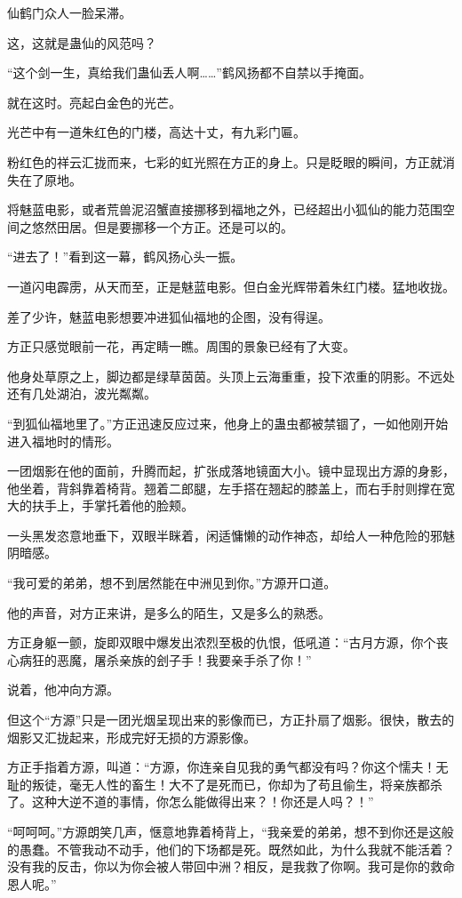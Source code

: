 \begin{this_body}
仙鹤门众人一脸呆滞。

这，这就是蛊仙的风范吗？

“这个剑一生，真给我们蛊仙丢人啊……”鹤风扬都不自禁以手掩面。

就在这时。亮起白金色的光芒。

光芒中有一道朱红色的门楼，高达十丈，有九彩门匾。

粉红色的祥云汇拢而来，七彩的虹光照在方正的身上。只是眨眼的瞬间，方正就消失在了原地。

将魅蓝电影，或者荒兽泥沼蟹直接挪移到福地之外，已经超出小狐仙的能力范围空间之悠然田居。但是要挪移一个方正。还是可以的。

“进去了！”看到这一幕，鹤风扬心头一振。

一道闪电霹雳，从天而至，正是魅蓝电影。但白金光辉带着朱红门楼。猛地收拢。

差了少许，魅蓝电影想要冲进狐仙福地的企图，没有得逞。

方正只感觉眼前一花，再定睛一瞧。周围的景象已经有了大变。

他身处草原之上，脚边都是绿草茵茵。头顶上云海重重，投下浓重的阴影。不远处还有几处湖泊，波光粼粼。

“到狐仙福地里了。”方正迅速反应过来，他身上的蛊虫都被禁锢了，一如他刚开始进入福地时的情形。

一团烟影在他的面前，升腾而起，扩张成落地镜面大小。镜中显现出方源的身影，他坐着，背斜靠着椅背。翘着二郎腿，左手搭在翘起的膝盖上，而右手肘则撑在宽大的扶手上，手掌托着他的脸颊。

一头黑发恣意地垂下，双眼半眯着，闲适慵懒的动作神态，却给人一种危险的邪魅阴暗感。

“我可爱的弟弟，想不到居然能在中洲见到你。”方源开口道。

他的声音，对方正来讲，是多么的陌生，又是多么的熟悉。

方正身躯一颤，旋即双眼中爆发出浓烈至极的仇恨，低吼道：“古月方源，你个丧心病狂的恶魔，屠杀亲族的刽子手！我要亲手杀了你！”

说着，他冲向方源。

但这个“方源”只是一团光烟呈现出来的影像而已，方正扑扇了烟影。很快，散去的烟影又汇拢起来，形成完好无损的方源影像。

方正手指着方源，叫道：“方源，你连亲自见我的勇气都没有吗？你这个懦夫！无耻的叛徒，毫无人性的畜生！大不了是死而已，你却为了苟且偷生，将亲族都杀了。这种大逆不道的事情，你怎么能做得出来？！你还是人吗？！”

“呵呵呵。”方源朗笑几声，惬意地靠着椅背上，“我亲爱的弟弟，想不到你还是这般的愚蠢。不管我动不动手，他们的下场都是死。既然如此，为什么我就不能活着？没有我的反击，你以为你会被人带回中洲？相反，是我救了你啊。我可是你的救命恩人呢。”


\end{this_body}
